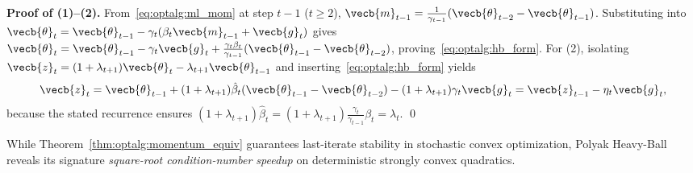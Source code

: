 \documentclass[../../../../master.tex]{subfiles}
\begin{document}
\begin{coremath}
\textbf{Proof of (1)--(2).} From~\eqref{eq:optalg:ml_mom} at step $t-1$ ($t \ge 2$), $\vecb{m}_{t-1} = \frac{1}{\gamma_{t-1}}(\vecb{\theta}_{t-2} - \vecb{\theta}_{t-1})$. Substituting into $\vecb{\theta}_t = \vecb{\theta}_{t-1} - \gamma_t(\beta_t\vecb{m}_{t-1} + \vecb{g}_t)$ gives $\vecb{\theta}_t = \vecb{\theta}_{t-1} - \gamma_t\vecb{g}_t + \frac{\gamma_t\beta_t}{\gamma_{t-1}}(\vecb{\theta}_{t-1} - \vecb{\theta}_{t-2})$, proving~\eqref{eq:optalg:hb_form}. For (2), isolating $\vecb{z}_t = (1 + \lambda_{t+1})\vecb{\theta}_t - \lambda_{t+1}\vecb{\theta}_{t-1}$ and inserting~\eqref{eq:optalg:hb_form} yields
\[
  \vecb{z}_t = \vecb{\theta}_{t-1} + (1 + \lambda_{t+1})\hat{\beta}_t(\vecb{\theta}_{t-1} - \vecb{\theta}_{t-2}) - (1 + \lambda_{t+1})\gamma_t \vecb{g}_t = \vecb{z}_{t-1} - \eta_t \vecb{g}_t,
\]
because the stated recurrence ensures $(1+\lambda_{t+1})\hat{\beta}_t = (1+\lambda_{t+1})\frac{\gamma_t}{\gamma_{t-1}}\beta_t = \lambda_t$. \qed
\end{coremath}

While Theorem~\ref{thm:optalg:momentum_equiv} guarantees last-iterate stability in stochastic convex optimization, Polyak Heavy-Ball reveals its signature \emph{square-root condition-number speedup} on deterministic strongly convex quadratics.
\end{document}
